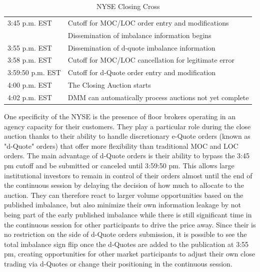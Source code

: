 \begin{table}[!ht]
   \centering
   \caption{NYSE Closing Cross\label{tab:NYSEclose}}
   \begin{tabular}{ll} 
	3:45 p.m. EST & Cutoff for MOC/LOC order entry and modifications  \\ 
	 & Dissemination of imbalance information begins  \\ \hline
	3:55 p.m. EST &  Dissemination of d-quote imbalance information\\ \hline
	3:58 p.m. EST & Cutoff for MOC/LOC cancellation for legitimate error \\ \hline
	3:59:50 p.m. EST & Cutoff for d-Quote order entry and modification \\ \hline
	4:00 p.m. EST & The Closing Auction starts \\ \hline
	4:02 p.m. EST & DMM can automatically process auctions not yet complete
   \end{tabular}
\end{table}	



One specificity of the NYSE is the presence of floor brokers operating in an agency capacity for their customers. They play a particular role during the close auction thanks to their ability to handle discretionary e-Quote orders (known as "d-Quote" orders) that offer more flexibility than traditional MOC and LOC orders. The main advantage of d-Quote orders is their ability to bypass the 3:45 pm cutoff and be submitted or canceled until 3:59:50 pm. This allows large institutional investors to remain in control of their orders almost until the end of the continuous session by delaying the decision of how much to allocate to the auction. They can therefore react to larger volume opportunities based on the published imbalance, but also minimize their own information leakage by not being part of the early published imbalance while there is still significant time in the continuous session for other participants to drive the price away.  Since their is no restriction on the side of d-Quote orders submission, it is possible to see the total imbalance sign flip once the d-Quotes are added to the publication at 3:55 pm, creating opportunities for other market participants to adjust their own close trading via d-Quotes or change their positioning in the continuous session. \\

